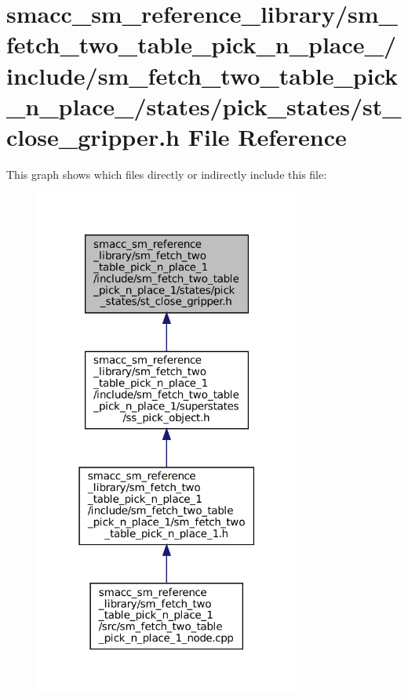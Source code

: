\hypertarget{sm__fetch__two__table__pick__n__place__1_2include_2sm__fetch__two__table__pick__n__place__1_2stab6c740b6a4921b74c47f90995fb96426}{}\section{smacc\+\_\+sm\+\_\+reference\+\_\+library/sm\+\_\+fetch\+\_\+two\+\_\+table\+\_\+pick\+\_\+n\+\_\+place\+\_/include/sm\+\_\+fetch\+\_\+two\+\_\+table\+\_\+pick\+\_\+n\+\_\+place\+\_/states/pick\+\_\+states/st\+\_\+close\+\_\+gripper.h File Reference}
\label{sm__fetch__two__table__pick__n__place__1_2include_2sm__fetch__two__table__pick__n__place__1_2stab6c740b6a4921b74c47f90995fb96426}
This graph shows which files directly or indirectly include this file\+:
\nopagebreak
\begin{figure}[H]
\begin{center}
\leavevmode
\includegraphics[width=247pt]{sm__fetch__two__table__pick__n__place__1_2include_2sm__fetch__two__table__pick__n__place__1_2sta1be1ed88e4bb26941ab24b8bc48c6a38}
\end{center}
\end{figure}

